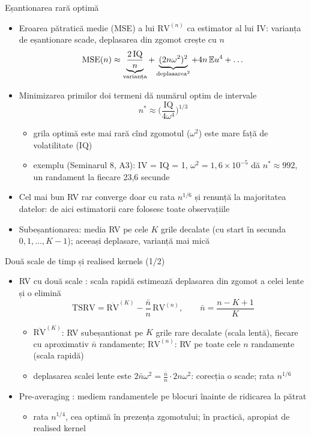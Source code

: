\begin{frame}{Eșantionarea rară optimă}
\itemsize{\small}
\begin{itemize}
    \item Eroarea pătratică medie (MSE) a lui $\mathrm{RV}^{(n)}$ ca estimator al lui IV: varianța de eșantionare scade, deplasarea din zgomot crește cu $n$
    \[ \mathrm{MSE}(n) \approx \underbrace{\frac{2\,\mathrm{IQ}}{n}}_{\text{varianța}} + \underbrace{(2n\omega^2)^2}_{\text{deplasarea}^2} + 4n\,\mathbb{E} u^4 + \dots \]
    \item Minimizarea primilor doi termeni dă numărul optim de intervale 
    \[ n^* \approx \Big(\frac{\mathrm{IQ}}{4\omega^4}\Big)^{1/3} \]
    \begin{itemize}
        \item grila optimă este mai rară cînd zgomotul ($\omega^2$) este mare față de volatilitate ($\mathrm{IQ}$)
        \item exemplu (Seminarul 8, A3): IV = IQ = 1, $\omega^2 = 1{,}6\times10^{-5}$ dă $n^* \approx 992$, un randament la fiecare 23{,}6 secunde
    \end{itemize}
    \item Cel mai bun RV rar converge doar cu rata $n^{1/6}$ și renunță la majoritatea datelor: de aici estimatorii care folosesc toate observațiile
    \item Subeșantionarea: media RV pe cele $K$ grile decalate (cu start în secunda $0, 1, \dots, K-1$); aceeași deplasare, varianță mai mică
\end{itemize}
\end{frame}

\begin{frame}{Două scale de timp și realised kernels (1/2)}
\itemsize{\small}
\begin{itemize}
    \item RV cu două scale : scala rapidă estimează deplasarea din zgomot a celei lente și o elimină
    \[ \mathrm{TSRV} = \overline{\mathrm{RV}}^{(K)} - \frac{\bar n}{n}\,\mathrm{RV}^{(n)}, \qquad \bar n = \frac{n - K + 1}{K} \]
    \begin{itemize}
        \item $\overline{\mathrm{RV}}^{(K)}$: RV subeșantionat pe $K$ grile rare decalate (scala lentă), fiecare cu aproximativ $\bar n$ randamente; $\mathrm{RV}^{(n)}$: RV pe toate cele $n$ randamente (scala rapidă)
        \item deplasarea scalei lente este $2\bar n\omega^2 = \frac{\bar n}{n}\cdot 2n\omega^2$: corecția o scade; rata $n^{1/6}$
    \end{itemize}
    \item Pre-averaging : mediem randamentele pe blocuri înainte de ridicarea la pătrat
    \begin{itemize}
        \item rata $n^{1/4}$, cea optimă în prezența zgomotului; în practică, apropiat de realised kernel
    \end{itemize}
\end{itemize}
\end{frame}

